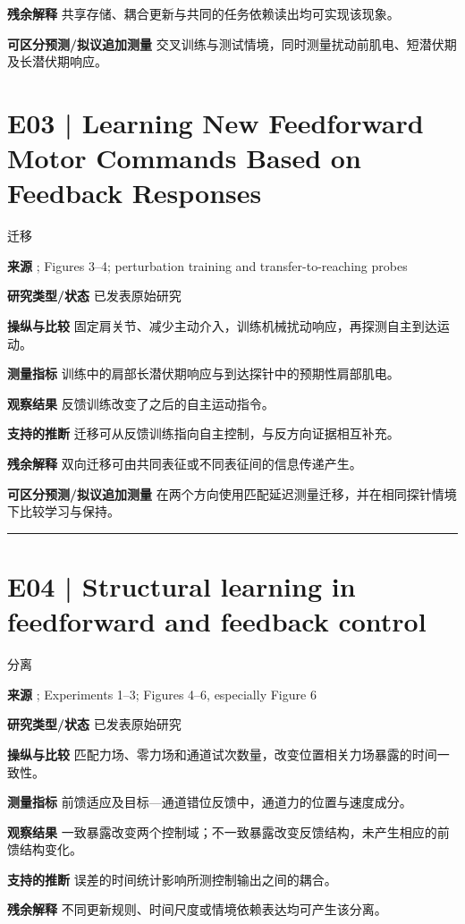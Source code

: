 \documentclass[11pt,a4paper]{article}
\begin{document}
\textbf{残余解释} 共享存储、耦合更新与共同的任务依赖读出均可实现该现象。\par
\textbf{可区分预测/拟议追加测量} 交叉训练与测试情境，同时测量扰动前肌电、短潜伏期及长潜伏期响应。\par
\clearpage\section{E03 | Learning New Feedforward Motor Commands Based on Feedback Responses}
{\small\sffamily\color{navy} 迁移}\par
\textbf{来源} \cite{maeda2020}; Figures 3--4; perturbation training and transfer-to-reaching probes\par
\textbf{研究类型/状态} 已发表原始研究\par
\textbf{操纵与比较} 固定肩关节、减少主动介入，训练机械扰动响应，再探测自主到达运动。\par
\textbf{测量指标} 训练中的肩部长潜伏期响应与到达探针中的预期性肩部肌电。\par
\textbf{观察结果} 反馈训练改变了之后的自主运动指令。\par
\textbf{支持的推断} 迁移可从反馈训练指向自主控制，与反方向证据相互补充。\par
\textbf{残余解释} 双向迁移可由共同表征或不同表征间的信息传递产生。\par
\textbf{可区分预测/拟议追加测量} 在两个方向使用匹配延迟测量迁移，并在相同探针情境下比较学习与保持。\par
\bigskip\hrule\medskip\section{E04 | Structural learning in feedforward and feedback control}
{\small\sffamily\color{navy} 分离}\par
\textbf{来源} \cite{yousif2012}; Experiments 1--3; Figures 4--6, especially Figure 6\par
\textbf{研究类型/状态} 已发表原始研究\par
\textbf{操纵与比较} 匹配力场、零力场和通道试次数量，改变位置相关力场暴露的时间一致性。\par
\textbf{测量指标} 前馈适应及目标---通道错位反馈中，通道力的位置与速度成分。\par
\textbf{观察结果} 一致暴露改变两个控制域；不一致暴露改变反馈结构，未产生相应的前馈结构变化。\par
\textbf{支持的推断} 误差的时间统计影响所测控制输出之间的耦合。\par
\textbf{残余解释} 不同更新规则、时间尺度或情境依赖表达均可产生该分离。\par
\end{document}
